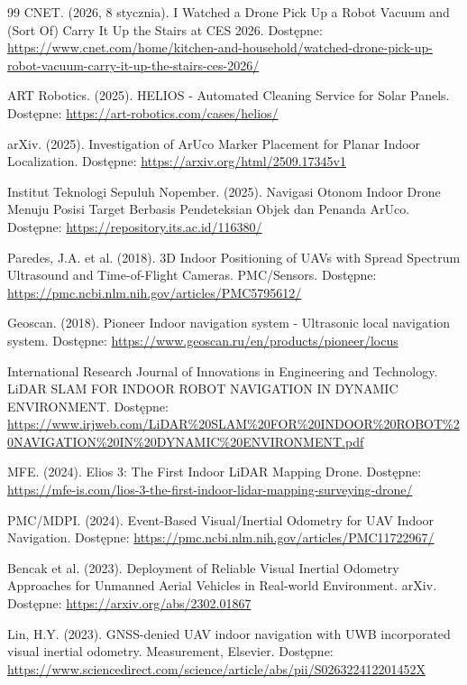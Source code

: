 \documentclass{EE-dyplom}
\begin{document}
\begin{itemize}
\begin{thebibliography}{99}
CNET. (2026, 8 stycznia). I Watched a Drone Pick Up a Robot Vacuum and (Sort Of) Carry It Up the Stairs at CES 2026. Dostępne: \url{https://www.cnet.com/home/kitchen-and-household/watched-drone-pick-up-robot-vacuum-carry-it-up-the-stairs-ces-2026/}

ART Robotics. (2025). HELIOS - Automated Cleaning Service for Solar Panels. Dostępne: \url{https://art-robotics.com/cases/helios/}

arXiv. (2025). Investigation of ArUco Marker Placement for Planar Indoor Localization. Dostępne: \url{https://arxiv.org/html/2509.17345v1}

Institut Teknologi Sepuluh Nopember. (2025). Navigasi Otonom Indoor Drone Menuju Posisi Target Berbasis Pendeteksian Objek dan Penanda ArUco. Dostępne: \url{https://repository.its.ac.id/116380/}

Paredes, J.A. et al. (2018). 3D Indoor Positioning of UAVs with Spread Spectrum Ultrasound and Time-of-Flight Cameras. PMC/Sensors. Dostępne: \url{https://pmc.ncbi.nlm.nih.gov/articles/PMC5795612/}

Geoscan. (2018). Pioneer Indoor navigation system - Ultrasonic local navigation system. Dostępne: \url{https://www.geoscan.ru/en/products/pioneer/locus}

International Research Journal of Innovations in Engineering and Technology. LiDAR SLAM FOR INDOOR ROBOT NAVIGATION IN DYNAMIC ENVIRONMENT. Dostępne: \url{https://www.irjweb.com/LiDAR\%20SLAM\%20FOR\%20INDOOR\%20ROBOT\%20NAVIGATION\%20IN\%20DYNAMIC\%20ENVIRONMENT.pdf}

MFE. (2024). Elios 3: The First Indoor LiDAR Mapping Drone. Dostępne: \url{https://mfe-is.com/lios-3-the-first-indoor-lidar-mapping-surveying-drone/}

PMC/MDPI. (2024). Event-Based Visual/Inertial Odometry for UAV Indoor Navigation. Dostępne: \url{https://pmc.ncbi.nlm.nih.gov/articles/PMC11722967/}

Bencak et al. (2023). Deployment of Reliable Visual Inertial Odometry Approaches for Unmanned Aerial Vehicles in Real-world Environment. arXiv. Dostępne: \url{https://arxiv.org/abs/2302.01867}

Lin, H.Y. (2023). GNSS-denied UAV indoor navigation with UWB incorporated visual inertial odometry. Measurement, Elsevier. Dostępne: \url{https://www.sciencedirect.com/science/article/abs/pii/S026322412201452X}


\end{thebibliography}
\end{itemize}
\end{document}

